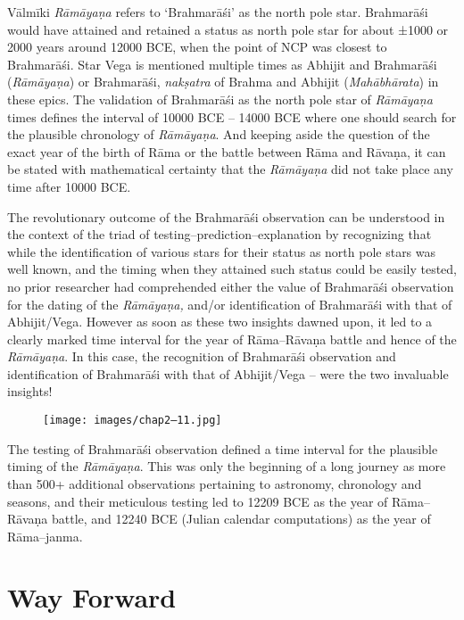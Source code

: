 Vālmīki \textit{Rāmāyaṇa} refers to ‘Brahmarāśi’ as the north pole star. Brahmarāśi would have attained and retained a status as north pole star for about ±1000 or 2000 years around 12000 BCE, when the point of NCP was closest to Brahmarāśi. Star Vega is mentioned multiple times as Abhijit and Brahmarāśi (\textit{Rāmāyaṇa}) or Brahmarāśi, \textit{nakṣatra} of Brahma and Abhijit (\textit{Mahābhārata}) in these epics. The validation of Brahmarāśi as the north pole star of \textit{Rāmāyaṇa} times defines the interval of 10000 BCE – 14000 BCE where one should search for the plausible chronology of \textit{Rāmāyaṇa}. And keeping aside the question of the exact year of the birth of Rāma or the battle between Rāma and Rāvaṇa, it can be stated with mathematical certainty that the \textit{Rāmāyaṇa} did not take place any time after 10000 BCE.

The revolutionary outcome of the Brahmarāśi observation can be understood in the context of the triad of testing–prediction–explanation by recognizing that while the identification of various stars for their status as north pole stars was well known, and the timing when they attained such status could be easily tested, no prior researcher had comprehended either the value of Brahmarāśi observation for the dating of the \textit{Rāmāyaṇa,} and/or identification of Brahmarāśi with that of Abhijit/Vega. However as soon as these two insights dawned upon, it led to a clearly marked time interval for the year of Rāma–Rāvaṇa battle and hence of the \textit{Rāmāyaṇa}. In this case, the recognition of Brahmarāśi observation and identification of Brahmarāśi with that of Abhijit/Vega – were the two invaluable insights!

\begin{figure}
\texttt{[image: images/chap2–11.jpg]}
\end{figure}

The testing of Brahmarāśi observation defined a time interval for the plausible timing of the \textit{Rāmāyaṇa}. This was only the beginning of a long journey as more than 500+ additional observations pertaining to astronomy, chronology and seasons, and their meticulous testing led to 12209 BCE as the year of Rāma–Rāvaṇa battle, and 12240 BCE (Julian calendar computations) as the year of Rāma–janma.


\section*{Way Forward}

